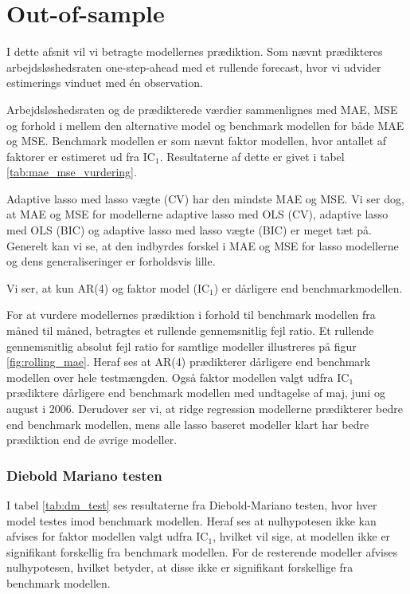 \chapter{Out-of-sample}
I dette afsnit vil vi betragte modellernes prædiktion.
Som nævnt prædikteres arbejdsløshedsraten one-step-ahead med et rullende forecast, hvor vi udvider estimerings vinduet med én observation. 

Arbejdsløshedsraten og de prædikterede værdier sammenlignes med MAE, MSE og forhold i mellem den alternative model og benchmark modellen for både MAE og MSE.
Benchmark modellen er som nævnt faktor modellen, hvor antallet af faktorer er estimeret ud fra IC$_1$.
Resultaterne af dette er givet i tabel \ref{tab:mae_mse_vurdering}.
%

Adaptive lasso med lasso vægte (CV) har den mindste MAE og MSE. 
Vi ser dog, at MAE og MSE for modellerne adaptive lasso med OLS (CV), adaptive lasso med OLS (BIC) og adaptive lasso med lasso vægte (BIC) er meget tæt på. 
Generelt kan vi se, at den indbyrdes forskel i MAE og MSE for lasso modellerne og dens generaliseringer er forholdsvis lille.
 
Vi ser, at kun AR(4) og faktor model (IC$_1$) er dårligere end benchmarkmodellen. 

For at vurdere modellernes prædiktion i forhold til benchmark modellen fra måned til måned, betragtes et rullende gennemsnitlig fejl ratio.
Et rullende gennemsnitlig absolut fejl ratio for samtlige modeller illustreres på figur \ref{fig:rolling_mae}.
Heraf ses at AR(4) prædikterer dårligere end benchmark modellen over hele testmængden.
Også faktor modellen valgt udfra IC$_1$ prædiktere dårligere end benchmark modellen med undtagelse af maj, juni og august i 2006.
Derudover ser vi, at ridge regression modellerne prædikterer bedre end benchmark modellen, mens alle lasso baseret modeller klart har bedre prædiktion end de øvrige modeller.
%
%

%
%

\subsection{Diebold Mariano testen}
I tabel \ref{tab:dm_test} ses resultaterne fra Diebold-Mariano testen, hvor hver model testes imod benchmark modellen.
Heraf ses at nulhypotesen ikke kan afvises for faktor modellen valgt udfra IC\(_1\), hvilket vil sige, at modellen ikke er signifikant forskellig fra benchmark modellen.
For de resterende modeller afvises nulhypotesen, hvilket betyder, at disse ikke er signifikant forskellige fra benchmark modellen.
%

%
\newpage
